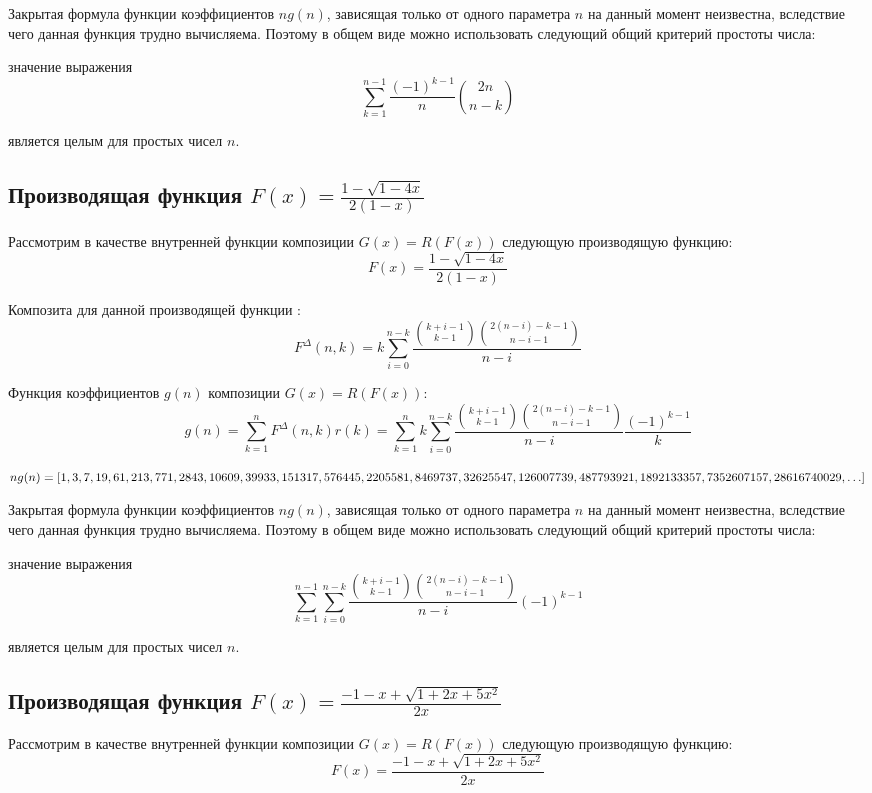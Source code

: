 \documentclass[
russian,
cp1251,
14pt,
simple
]{eskdtext}
\theoremstyle{definition}
\begin{document}
Закрытая формула функции коэффициентов $ng(n)$, зависящая только от одного параметра $n$ на данный момент неизвестна, вследствие чего данная функция трудно вычисляема. Поэтому в общем виде можно использовать следующий общий критерий простоты числа:

значение выражения
$$
\sum^{n-1}_{k=1}{\frac{(-1)^{k-1}}{n} {2n \choose n-k}}
$$

является целым для простых чисел $n$.

\subsection{Производящая функция $F(x)=\frac{1-\sqrt{1-4x}}{2(1-x)}$}
Рассмотрим в качестве внутренней функции композиции $G(x)=R(F(x))$ следующую производящую функцию:
$$
F(x)=\frac{1-\sqrt{1-4x}}{2(1-x)}
$$

Композита для данной производящей функции \cite{KruchininVV}:
$$
F^\Delta(n,k)=k \sum^{n-k}_{i=0}{\frac{{k+i-1 \choose k-1} {2(n-i)-k-1 \choose n-i-1}}{n-i}}
$$

Функция коэффициентов $g(n)$ композиции $G(x)=R(F(x))$:
$$
g(n)=\sum^{n}_{k=1}{F^\Delta(n,k)r(k)}=\sum^{n}_{k=1}{k \sum^{n-k}_{i=0}{\frac{{k+i-1 \choose k-1} {2(n-i)-k-1 \choose n-i-1}}{n-i}} \frac{(-1)^{k-1}}{k}}
$$

\begin{math}
ng(n)=[1,3,7,19,61,213,771,2843,10609,39933,151317,576445,2205581,\\
8469737,32625547,126007739,487793921,1892133357,7352607157,28616740029,\ldots]
\end{math}

Закрытая формула функции коэффициентов $ng(n)$, зависящая только от одного параметра $n$ на данный момент неизвестна, вследствие чего данная функция трудно вычисляема. Поэтому в общем виде можно использовать следующий общий критерий простоты числа:

значение выражения
$$
\sum^{n-1}_{k=1}{\sum^{n-k}_{i=0}{\frac{{k+i-1 \choose k-1} {2(n-i)-k-1 \choose n-i-1}}{n-i}} (-1)^{k-1}}
$$

является целым для простых чисел $n$.

\subsection{Производящая функция $F(x)=\frac{-1-x+\sqrt{1+2x+5x^2}}{2x}$}
Рассмотрим в качестве внутренней функции композиции $G(x)=R(F(x))$ следующую производящую функцию:
$$
F(x)=\frac{-1-x+\sqrt{1+2x+5x^2}}{2x}
$$
\end{document}
